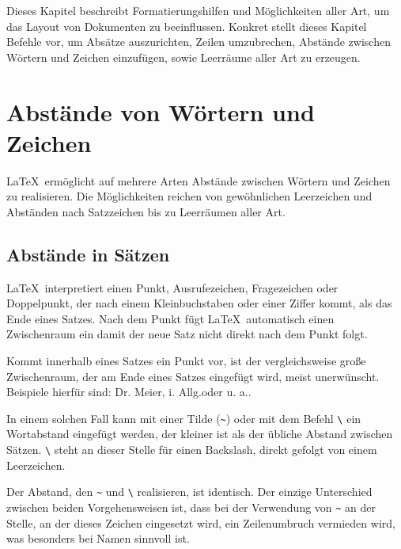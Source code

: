 \documentclass[a4paper,10pt,twoside]{scrbook}
\begin{document}
Dieses Kapitel beschreibt Formatierungshilfen und Möglichkeiten
aller Art, um das Layout von Dokumenten zu beeinflussen. 
Konkret stellt dieses Kapitel Befehle vor, um Absätze 
auszurichten, Zeilen umzubrechen,  
Abstände zwischen Wörtern und Zeichen einzufügen, sowie  
Leerräume aller Art zu erzeugen.

\section{Abstände von Wörtern und Zeichen}
\label{AbschnittWortabstandZeichenabstand}

\LaTeX\ ermöglicht auf mehrere Arten Abstände zwischen Wörtern und
Zeichen zu realisieren. Die Möglichkeiten reichen von gewöhnlichen Leerzeichen und Abständen nach Satzzeichen bis zu Leerräumen aller Art.

\subsection{Abstände in Sätzen}
\label{AbschnittAbstaendeSaetzen}

\LaTeX\ interpretiert einen Punkt, Ausrufezeichen, Fragezeichen oder Doppelpunkt,
der nach einem Kleinbuchstaben oder einer Ziffer kommt, als das Ende eines Satzes.
Nach dem Punkt fügt \LaTeX\ automatisch einen Zwischenraum ein damit der neue Satz nicht direkt nach dem Punkt folgt. 

Kommt innerhalb eines Satzes ein Punkt vor, ist der vergleichsweise große Zwischenraum, der am Ende eines Satzes eingefügt wird, meist unerwünscht. Beispiele hierfür sind: \frqq Dr. Meier\flqq, \frqq i. Allg.\flqq oder \frqq u. a.\flqq.

In einem solchen Fall kann mit einer 
Tilde (\texttt{\textasciitilde})  oder mit dem 
Befehl \verb!\!\texttt{\textvisiblespace}  
ein Wortabstand eingefügt werden, der kleiner ist als der übliche Abstand zwischen 
Sätzen. \verb!\!\texttt{\textvisiblespace} steht an dieser Stelle für einen Backslash, direkt gefolgt von einem Leerzeichen.


\fbox{\texttt{\textasciitilde}}

\fbox{\texttt{\textbackslash \textvisiblespace}}

Der Abstand, den \texttt{\textasciitilde} und
\verb!\!\texttt{\textvisiblespace} realisieren, ist identisch. Der einzige Unterschied zwischen beiden Vorgehensweisen ist, dass bei der Verwendung 
von \texttt{\textasciitilde} 
an der Stelle, an der dieses Zeichen eingesetzt wird, ein Zeilenumbruch
vermieden wird, was besonders bei Namen sinnvoll ist.
\end{document}
